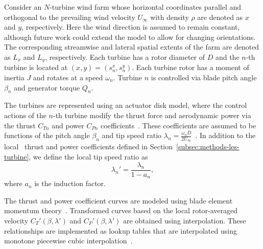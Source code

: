 Consider an $N$-turbine wind farm whose horizontal coordinates parallel and orthogonal to the prevailing wind velocity $U_\infty$ with density $\rho$ are denoted as $x$ and $y$, respectively. Here the wind direction is assumed to remain constant, although future work could extend the model to allow for changing orientations. The corresponding streamwise and lateral spatial extents of the farm are denoted as $L_x$ and $L_y$, respectively. Each turbine has a rotor diameter of $D$ and the $n$-th turbine is located at $(x,y) = (s_n^x,  s_n^y)$. Each turbine rotor has a moment of inertia $J$ and rotates at a speed $\omega_n$. Turbine $n$ is controlled via blade pitch angle $\beta_n$ and generator torque $Q_n$.

The turbines are represented using an actuator disk model, where the control actions of the $n$-th turbine modify the thrust force and aerodynamic power via the thrust $C_{Tn}$ and power $C_{Pn}$ coefficients~\cite{Burton2011a}. These coefficients are assumed to be functions of the pitch angle $\beta_n$ and tip speed ratio $\lambda_n = \frac{\omega_n D}{2 U_\infty}$~\cite{Burton2011a, Pao2011a}. In addition to the local~\cite{Meyers2010a, Calaf2010a} thrust and power coefficients defined in Section~\ref{subsec:methods-les-turbine}, we define the local tip speed ratio as
%
\begin{equation}
\lambda_n' = \frac{\lambda_n}{1-a_n},
\end{equation}
%
where $a_n$ is the induction factor.

The thrust and power coefficient curves are modeled using blade element momentum theory~\cite{Hansen2008a}. Transformed curves based on the local rotor-averaged velocity $C_T'(\beta, \lambda')$ and $C_P'(\beta,\lambda')$  are obtained using interpolation. These relationships are implemented as lookup tables that are interpolated using monotone piecewise cubic interpolation~\cite{Fritsch1980a}.

